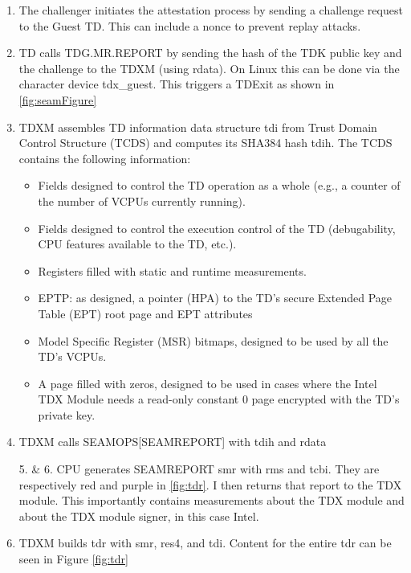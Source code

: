 \begin{enumerate}
\item The challenger initiates the attestation process by sending a challenge request to the Guest TD. This can include a nonce to prevent replay attacks\cite{sardar_formal_2023}.
\item TD calls TDG.MR.REPORT by sending the hash of the TDK public key and the challenge to the TDXM (using rdata). On Linux this can be done via the character device tdx\_guest. This triggers a TDExit as shown in \cref{fig:seamFigure}
\item TDXM assembles TD information data structure tdi from Trust Domain Control Structure (TCDS) and computes its SHA384 hash tdih. The TCDS contains the following information:
\begin{itemize}
    \item Fields designed to control the TD operation as a whole (e.g., a counter of the number of VCPUs currently running). 
    \item Fields designed to control the execution control of the TD (debugability, CPU features available to the TD, etc.). 
    \item Registers filled with static and runtime measurements. 
    \item EPTP: as designed, a pointer (HPA) to the TD’s secure Extended Page Table (EPT) root page and EPT attributes
    \item Model Specific Register (MSR) bitmaps, designed to be used by all the TD’s VCPUs. 
    \item A page filled with zeros, designed to be used in cases where the Intel TDX Module needs a read-only constant 0 page encrypted with the TD’s private key.
\end{itemize}
\item TDXM calls SEAMOPS[SEAMREPORT] with tdih and rdata
\item[5. \& 6.] CPU generates SEAMREPORT smr with rms and tcbi. They are respectively red and purple in \cref{fig:tdr}. I then returns that report to the TDX module. This importantly contains measurements about the TDX module and about the TDX module signer, in this case Intel.
\item TDXM builds tdr with smr, res4, and tdi. Content for the entire tdr can be seen in Figure \ref{fig:tdr}
\begin{figure}
\centering

\end{figure}
\end{enumerate}
